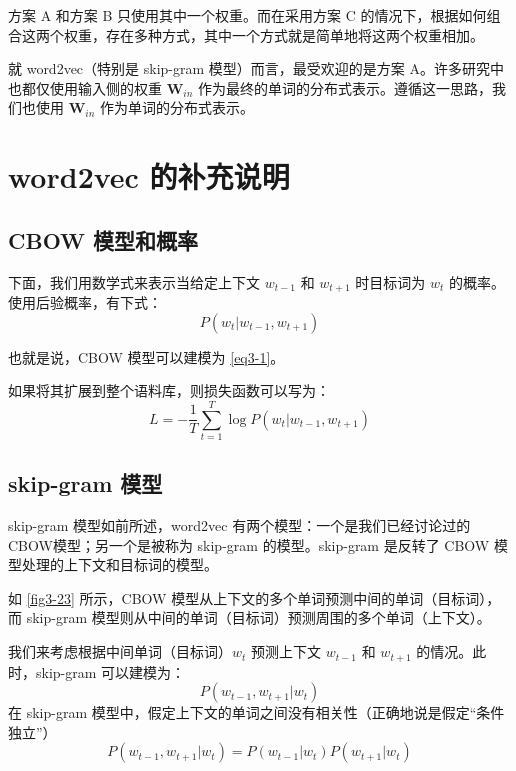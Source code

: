 方案 A 和方案 B 只使用其中一个权重。而在采用方案 C 的情况下，根据如何组合这两个权重，存在多种方式，其中一个方式就是简单地将这两个权重相加。

就 word2vec（特别是 skip-gram 模型）而言，最受欢迎的是方案 A。许多研究中也都仅使用输入侧的权重 $\bm{W}_{in}$ 作为最终的单词的分布式表示。遵循这一思路，我们也使用 $\bm{W}_{in}$ 作为单词的分布式表示。
\section{word2vec 的补充说明}
\subsection{CBOW 模型和概率}
下面，我们用数学式来表示当给定上下文 $w_{t-1}$ 和 $w_{t+1}$ 时目标词为 $w_t$ 的概率。使用后验概率，有下式：
\begin{equation}
    \label{eq3-1}
    P(w_t|w_{t-1}, w_{t+1})
\end{equation}

也就是说，CBOW 模型可以建模为 \autoref{eq3-1}。

如果将其扩展到整个语料库，则损失函数可以写为：
\begin{equation}
    L=-\frac{1}{T}\sum_{t=1}^{T}\log P(w_t|w_{t-1}, w_{t+1})
\end{equation}

\subsection{skip-gram 模型}
skip-gram 模型如前所述，word2vec 有两个模型：一个是我们已经讨论过的 CBOW模型；另一个是被称为 skip-gram 的模型。skip-gram 是反转了 CBOW 模型处理的上下文和目标词的模型。

如 \autoref{fig3-23} 所示，CBOW 模型从上下文的多个单词预测中间的单词（目标词），而 skip-gram 模型则从中间的单词（目标词）预测周围的多个单词（上下文）。

我们来考虑根据中间单词（目标词）$w_t$ 预测上下文 $w_{t-1}$ 和 $w_{t+1}$ 的情况。此时，skip-gram 可以建模为：
\begin{equation}
    P(w_{t-1}, w_{t+1}|w_t)
\end{equation}
在 skip-gram 模型中，假定上下文的单词之间没有相关性（正确地说是假定“条件独立”）
\begin{equation}
    P(w_{t-1}, w_{t+1}|w_t)=P(w_{t-1}|w_t)P(w_{t+1}|w_t)
\end{equation}

